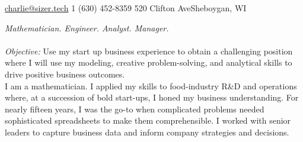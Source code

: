 \documentclass[10pt,a4paper]{article} %
\begin{document}
 



\noindent\href{mailto:charlie@sizer.tech}{charlie@sizer.tech}\bull %
\textsmaller{+}1 (630) 452-8359\bull %
520 Clifton Ave\bull Sheboygan, WI%

\spacedhrule{0.9em}{-0.4em} %



\vspace{-1.3em} %

\begin{multicols}{2}  %
\noindent \textit{Mathematician. Engineer. Analyst. Manager.}\\\\
\emph{Objective: }Use my start up business experience to obtain a challenging position where I will use my modeling, creative problem-solving, and analytical skills to drive positive business outcomes.  \\

\noindent I am a mathematician. I applied my skills to food-industry R\&D and operations where, at a succession of bold start-ups, I honed my business understanding. For nearly fifteen years, I was the go-to when complicated problems needed sophisticated spreadsheets to make them comprehensible.  I worked with senior leaders to capture business data and inform company strategies and decisions. 

\end{multicols}
\end{document}
